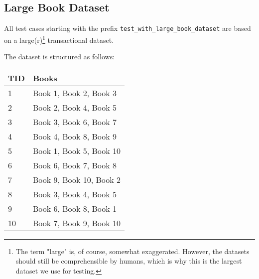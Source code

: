 \documentclass[
english,
smallborders
]{i6prcsht}
\begin{document}
\vspace*{1cm}

\subsection*{Large Book Dataset}

All test cases starting with the prefix \texttt{test\_with\_large\_book\_dataset} are based on a large(r)\footnote{The term "large" is, of course, somewhat exaggerated. However, the datasets should still be comprehensible by humans, which is why this is the largest dataset we use for testing.} transactional dataset.

The dataset is structured as follows:

\vspace*{1cm}

\begin{table}[ht]
	\centering
	\begin{minipage}[t]{0.5\textwidth}
		\centering
		\begin{tabular}{|l|l|}
			\hline
			\textbf{TID} & \textbf{Books}          \\
			\hline
			1            & Book 1, Book 2, Book 3  \\
			2            & Book 2, Book 4, Book 5  \\
			3            & Book 3, Book 6, Book 7  \\
			4            & Book 4, Book 8, Book 9  \\
			5            & Book 1, Book 5, Book 10 \\
			6            & Book 6, Book 7, Book 8  \\
			7            & Book 9, Book 10, Book 2 \\
			8            & Book 3, Book 4, Book 5  \\
			9            & Book 6, Book 8, Book 1  \\
			10           & Book 7, Book 9, Book 10 \\
			\hline
		\end{tabular}
	\end{minipage}%
	\begin{minipage}[t]{0.5\textwidth}
		\centering
\end{minipage}
\end{table}
\end{document}
